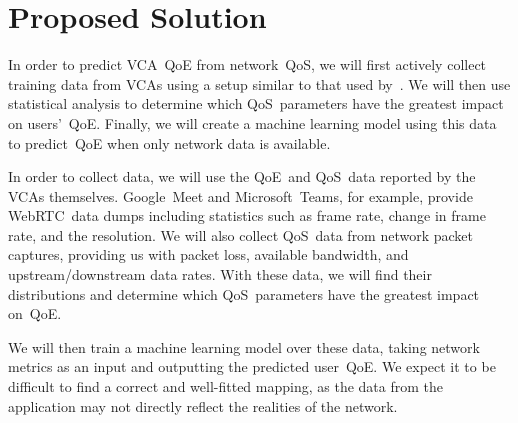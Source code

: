 \section{Proposed Solution}\label{proposed-solution}
    In order to predict VCA~QoE from network~QoS, we will first actively collect training data from VCAs using a setup similar to that used by~\textcite{MacMillanKyle2021MtPa}. We will then use statistical analysis to determine which QoS~parameters have the greatest impact on users'~QoE. Finally, we will create a machine learning model using this data to predict~QoE when only network data is available.

    In order to collect data, we will use the QoE~and QoS~data reported by the VCAs themselves. Google~Meet and Microsoft~Teams, for example, provide WebRTC~data dumps including statistics such as frame rate, change in frame rate, and the resolution. We will also collect QoS~data from network packet captures, providing us with packet loss, available bandwidth, and upstream/downstream data rates. With these data, we will find their distributions and determine which QoS~parameters have the greatest impact on~QoE.

    We will then train a machine learning model over these data, taking network metrics as an input and outputting the predicted user~QoE. We expect it to be difficult to find a correct and well-fitted mapping, as the data from the application may not directly reflect the realities of the network.



